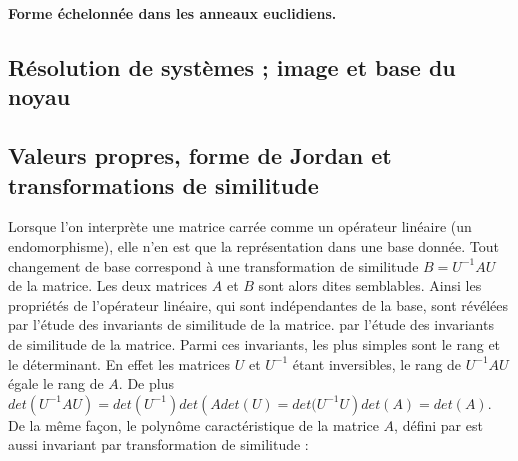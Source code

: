 \textbf{Forme échelonnée dans les anneaux euclidiens.}
\subsection{ Résolution de systèmes ; image et base du noyau}
\subsection{Valeurs propres, forme de Jordan et transformations de similitude}
Lorsque l’on interprète une matrice carrée comme un opérateur linéaire (un endomorphisme), elle n’en est que la représentation dans une base donnée. Tout changement de base correspond à une transformation de similitude 
$B = U^{-1}AU$ de la matrice. Les deux matrices $A$ et $B$ sont alors dites semblables. Ainsi les propriétés de l’opérateur linéaire, qui sont indépendantes de la base, sont révélées par l’étude des invariants de similitude de la matrice.
par l’étude des invariants de similitude de la matrice. Parmi ces invariants, les plus simples sont le rang et le déterminant. En effet les matrices $U$ et $U^{-1}$ étant inversibles, le rang de $U^{-1}AU$ égale le rang de $A$. De plus $det\left( U^{-1}AU\right)  = det\left( U^{-1}\right) det \left(A det(U) = det(U^{-1}U\right) det\left( A\right) = det\left(A\right)$. De
la même façon, le polynôme caractéristique de la matrice $A$, défini par 
 est aussi invariant par transformation de similitude :
%

